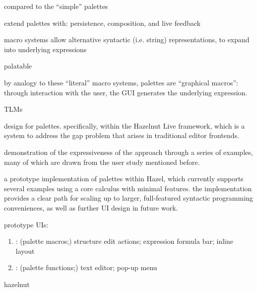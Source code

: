 


compared to the ``simple'' palettes

extend palettes with: persistence, composition, and live feedback

macro systems allow alternative syntactic (i.e. string) representations, to
expand into underlying expressions

palatable

by analogy to these ``literal'' macro systems, palettes are ``graphical
macros'': through interaction with the user, the GUI generates the underlying
expression.

TLMs~\cite{TLMs}




design for palettes. specifically, within the Hazelnut Live framework,
which is a system to address the gap problem that arises in traditional editor
frontends.

demonstration of the expressiveness of the approach through a series of
examples, many of which are drawn from the user study mentioned before.

a prototype implementation of palettes within Hazel, which currently
supports several examples using a core calculus with minimal features. the
implementation provides a clear path for scaling up to larger, full-featured
syntactic programming conveniences, as well as further UI design in future work.

prototype UIs:

  \begin{enumerate}
    \item \Hazel{}: (palette macros;) structure edit actions; expression formula bar; inline layout
    \item \sns{}: (palette functions;) text editor; pop-up menu
  \end{enumerate}

hazelnut~\citep{Hazelnut,HazelnutLive}



